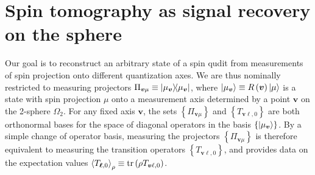 \documentclass[nofootinbib,notitlepage,twocolumn]{revtex4-2}
\newcommand{\p}[1]{\left(#1\right)} %
\renewcommand{\set}[1]{\left\{#1\right\}} %
\newcommand{\bk}{\Braket} %
\renewcommand{\v}{\bm} %
\newcommand{\1}{\mathds{1}}
\begin{document}
\section{Spin tomography as signal recovery on the sphere}

Our goal is to reconstruct an arbitrary state of a spin qudit from measurements of spin projection onto different quantization axes.
We are thus nominally restricted to measuring projectors $\Pi_{\v v\mu} \equiv \op{\mu_{\v v}}$, where $\ket{\mu_{\v v}}\equiv R\p{\v v}\ket{\mu}$ is a state with spin projection $\mu$ onto a measurement axis determined by a point $\v v$ on the 2-sphere $\Omega_2$.
For any fixed axis $\v v$, the sets $\set{\Pi_{\v v\mu}}$ and $\set{T_{\v v\ell,0}}$ are both orthonormal bases for the space of diagonal operators in the basis $\set{\ket{\mu_{\v v}}}$.
By a simple change of operator basis, measuring the projectors $\set{\Pi_{\v v\mu}}$ is therefore equivalent to measuring the transition operators $\set{T_{\v v\ell,0}}$, and provides data on the expectation values $\bk{T_{\v \ell,0}}_\rho\equiv\tr\p{\rho T_{\v v\ell,0}}$.
\end{document}
